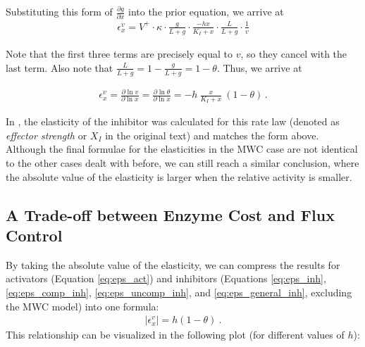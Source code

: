 \documentclass[12pt,a4paper]{article}
\begin{document}
Substituting this form of $\frac{\partial g}{\partial x}$ into the prior equation, we arrive at 
\begin{eqnarray}
\epsilon_x^v = V^+ \cdot \kappa \cdot \frac{g}{L + g} \cdot \frac{-hx}{K_I + x} \cdot \frac{L}{L + g} \cdot \frac{1}{v}
\end{eqnarray}

\noindent Note that the first three terms are precisely equal to $v$, so they cancel with the last term. Also note that $\frac{L}{L + g} = 1 - \frac{g}{L + g} = 1 - \theta$. Thus, we arrive at

\begin{eqnarray}
\epsilon_x^v = \frac{\partial \ln{v}}{\partial \ln{x}} = \frac{\partial \ln{\theta}}{\partial \ln{x}} = -h~\frac{x}{K_I + x} ~\left(1 - \theta \right)\,.
\end{eqnarray}

In \cite{Heinrich1974-yj}, the elasticity of the inhibitor was calculated for this rate law (denoted as \emph{effector strength} or $X_I$ in the original text) and matches the form above.
Although the final formulae for the elasticities in the MWC case are not identical to the other cases dealt with before, we can still reach a similar conclusion, where the absolute value of the elasticity is larger when the relative activity is smaller.

\subsection{A Trade-off between Enzyme Cost and Flux Control}
By taking the absolute value of the elasticity, we can compress the results for activators (Equation \ref{eq:eps_act}) and inhibitors (Equations \ref{eq:eps_inh}, \ref{eq:eps_comp_inh}, \ref{eq:eps_uncomp_inh}, and \ref{eq:eps_general_inh}, excluding the MWC model) into one formula:
\begin{eqnarray}
|\epsilon_x^v| = h (1 - \theta)~. \label{eq:abs_elast}
\end{eqnarray}
This relationship can be visualized in the following plot (for different values of $h$):
\begin{center}
\end{center}
\end{document}
